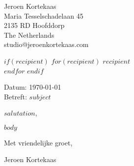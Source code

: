 \documentclass[10pt,a4paper]{article}
\begin{document}
\fontsize{9}{15}\selectfont

\noindent
\hfill
\begin{minipage}[t]{0.5\textwidth}
\raggedleft
{\fontsize{11}{16}\selectfont Jeroen Kortekaas} \\
Maria Tesselschadelaan 45 \\
2135 RD Hoofddorp \\
The Netherlands \\
studio@jeroenkortekaas.com \\
\end{minipage}

\vspace{1.5em}

\begin{adjustwidth}{15mm}{15mm}

$if(recipient)$
{\fontsize{11}{16}\selectfont
$for(recipient)$
$recipient$ \\ 
$endfor$
}
$endif$


\vspace{1.5em}

Datum: \today \\
Betreft: $subject$ \\

\vspace{1.5em}

$salutation$,

$body$

\vspace{2em}

Met vriendelijke groet,

\vspace{3em}

Jeroen Kortekaas

\end{adjustwidth}
\end{document}
